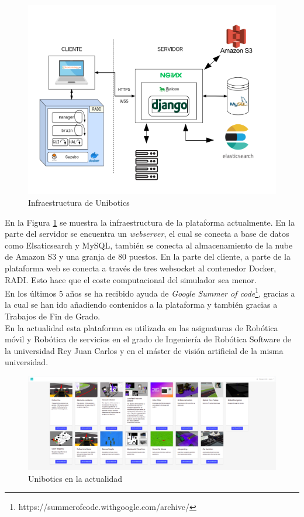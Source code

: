\begin{figure}[H]
    \centering
    \includegraphics[width=13cm, keepaspectratio]{img/infraestructura.png}
    \caption{Infraestructura de Unibotics}
    \label{fig:infra}
\end{figure}
En la Figura \ref{fig:infra} se muestra la infraestructura de la plataforma actualmente. En la parte del servidor se encuentra un \textit{webserver}, el cual se conecta a base de datos como Elsaticsearch y MySQL, también se conecta al almacenamiento de la nube de Amazon S3 y una granja de 80 puestos. En la parte del cliente, a parte de la plataforma web se conecta a través de tres websocket al contenedor Docker, RADI. Esto hace que el coste computacional del simulador sea menor.\\

En los últimos 5 años se ha recibido ayuda de \textit{Google Summer of code}\footnote{https://summerofcode.withgoogle.com/archive/}, gracias a la cual se han ido añadiendo contenidos a la plataforma y también gracias a Trabajos de Fin de Grado.\\

En la actualidad esta plataforma es utilizada en las asignaturas de Robótica móvil y Robótica de servicios en el grado de Ingeniería de Robótica Software  de la universidad Rey Juan Carlos y en el máster de visión artificial de la misma universidad.

\begin{figure}[H]
    \centering
    \includegraphics[width=15cm, keepaspectratio]{img/unibotics.png}
    \caption{Unibotics en la actualidad}
    \label{fig:unibotics}
\end{figure}

